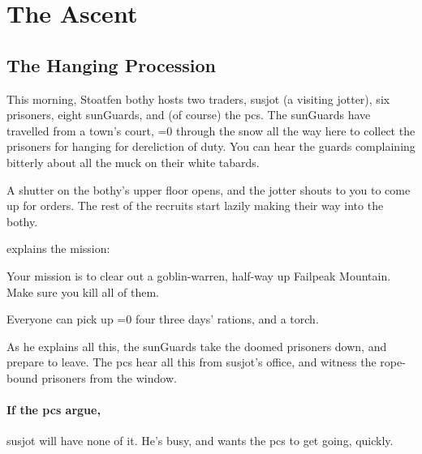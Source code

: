 \section{The Ascent}


\begin{multicols}{2}
\renewcommand\npcsymbol{\glsfmttext{afternoon}}

\subsection[The Hanging Procession]{The Hanging Procession}

\begin{boxtext}
  This morning, Stoatfen \gls{bothy} hosts two traders, \gls{susjot} (a visiting \gls{jotter}), six prisoners, eight \glspl{sunGuard}, and (of course) the \glspl{pc}.
  The \glspl{sunGuard} have travelled from a town's \gls{court},
  \ifnum\value{temperature}=0%
    through the \gls{snow}
  \else
    all the way here
  \fi%
  to collect the prisoners for hanging for dereliction of duty.
  You can hear the guards complaining bitterly about all the muck on their white tabards.

  A shutter on the \gls{bothy}'s upper floor opens, and the \gls{jotter} shouts to you to come up for orders.
  The rest of the recruits start lazily making their way into the \gls{bothy}.
\end{boxtext}

 explains the mission:

\begin{exampletext}
  Your mission is to clear out a goblin-warren, half-way up Failpeak Mountain.
  Make sure you kill all of them.

  Everyone can pick up \ifnum\value{temperature}=0 four \else three \fi days' rations, and a torch.
\end{exampletext}

\noindent
As he explains all this, the \glspl{sunGuard} take the doomed prisoners down, and prepare to leave.
The \glspl{pc} hear all this from \gls{susjot}'s office, and witness the rope-bound prisoners from the window.

\paragraph{If the \glspl{pc} argue,}
\gls{susjot} will have none of it.
He's busy, and wants the \glspl{pc} to get going, quickly.


\end{multicols}
